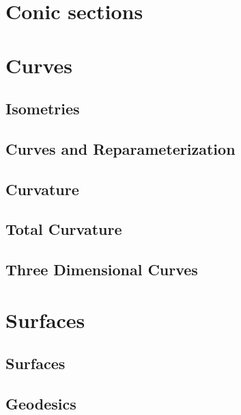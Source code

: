 \documentclass[10pt]{article}
\begin{document}

\bigskip

\tableofcontents

\newpage
\section{Conic sections}



\newpage
\section{Curves}

\subsection{Isometries}



\subsection{Curves and Reparameterization}



\subsection{Curvature}



\subsection{Total Curvature}



\subsection{Three Dimensional Curves}



\section{Surfaces}

\subsection{Surfaces}



\subsection{Geodesics}


\end{document}
